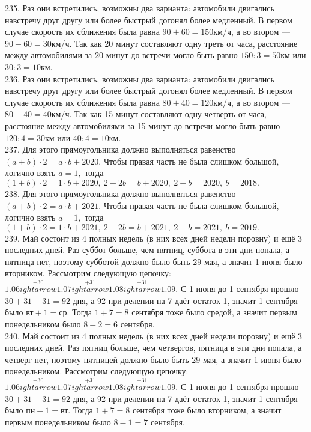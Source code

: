 235. Раз они встретились, возможны два варианта: автомобили двигались навстречу друг другу или более быстрый догонял более медленный. В первом случае скорость их сближения была равна $90+60=150$км/ч, а во втором --- $90-60=30$км/ч. Так как 20 минут составляют одну треть от часа, расстояние между автомобилями за 20 минут до встречи могло быть равно $150:3=50$км или $30:3=10$км.\\
236. Раз они встретились, возможны два варианта: автомобили двигались навстречу друг другу или более быстрый догонял более медленный. В первом случае скорость их сближения была равна $80+40=120$км/ч, а во втором --- $80-40=40$км/ч. Так как 15 минут составляют одну четверть от часа, расстояние между автомобилями за 15 минут до встречи могло быть равно $120:4=30$км или $40:4=10$км.\\
237. Для этого прямоугольника должно выполняться равенство $(a+b)\cdot2=a\cdot b+2020.$ Чтобы правая часть не была слишком большой, логично взять $a=1,$ тогда
$(1+b)\cdot 2=1\cdot b+2020,\ 2+2b=b+2020,\ 2+b=2020,\ b=2018.$\\
238. Для этого прямоугольника должно выполняться равенство $(a+b)\cdot2=a\cdot b+2021.$ Чтобы правая часть не была слишком большой, логично взять $a=1,$ тогда
$(1+b)\cdot 2=1\cdot b+2021,\ 2+2b=b+2021,\ 2+b=2021,\ b=2019.$\\
239. Май состоит из 4 полных недель (в них всех дней недели поровну) и ещё 3 последних дней. Раз суббот больше, чем пятниц, суббота в эти дни попала, а пятница нет, поэтому субботой должно было быть 29 мая, а значит 1 июня было вторником. Рассмотрим следующую цепочку:
$1.06\stackrel{+30}{
ightarrow}1.07\stackrel{+31}{
ightarrow}1.08\stackrel{+31}{
ightarrow}1.09.$ С 1 июня до 1 сентября прошло $30+31+31=92$ дня, а 92 при делении на 7 даёт остаток 1, значит 1 сентября было $\text{вт}+1=\text{ср}.$ Тогда $1+7=8$ сентября тоже было средой, а значит первым понедельником было $8-2=6$ сентября.\\
240. Май состоит из 4 полных недель (в них всех дней недели поровну) и ещё 3 последних дней. Раз пятниц больше, чем четвергов, пятница в эти дни попала, а четверг нет, поэтому пятницей должно было быть 29 мая, а значит 1 июня было понедельником. Рассмотрим следующую цепочку:
$1.06\stackrel{+30}{
ightarrow}1.07\stackrel{+31}{
ightarrow}1.08\stackrel{+31}{
ightarrow}1.09.$ С 1 июня до 1 сентября прошло $30+31+31=92$ дня, а 92 при делении на 7 даёт остаток 1, значит 1 сентября было $\text{пн}+1=\text{вт}.$ Тогда $1+7=8$ сентября тоже было вторником, а значит первым понедельником было $8-1=7$ сентября.\\
